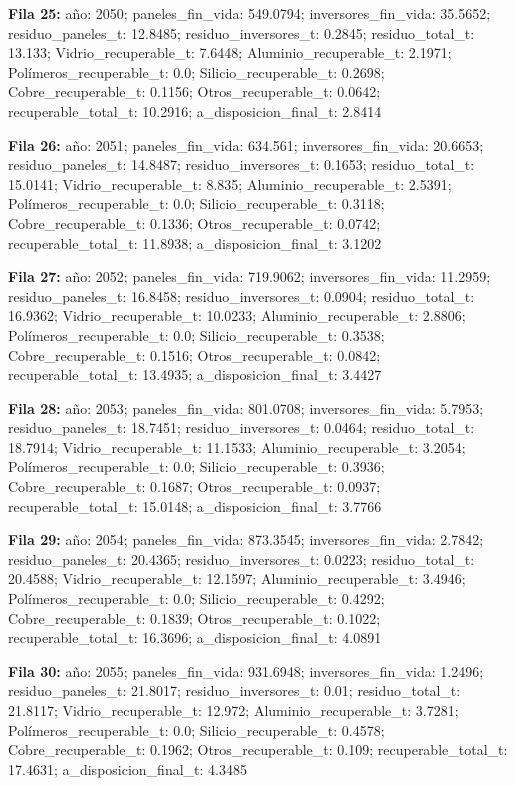 {\footnotesize\textbf{Fila 25:} año: 2050; paneles\_fin\_vida: 549.0794; inversores\_fin\_vida: 35.5652; residuo\_paneles\_t: 12.8485; residuo\_inversores\_t: 0.2845; residuo\_total\_t: 13.133; Vidrio\_recuperable\_t: 7.6448; Aluminio\_recuperable\_t: 2.1971; Polímeros\_recuperable\_t: 0.0; Silicio\_recuperable\_t: 0.2698; Cobre\_recuperable\_t: 0.1156; Otros\_recuperable\_t: 0.0642; recuperable\_total\_t: 10.2916; a\_disposicion\_final\_t: 2.8414\par}
{\footnotesize\textbf{Fila 26:} año: 2051; paneles\_fin\_vida: 634.561; inversores\_fin\_vida: 20.6653; residuo\_paneles\_t: 14.8487; residuo\_inversores\_t: 0.1653; residuo\_total\_t: 15.0141; Vidrio\_recuperable\_t: 8.835; Aluminio\_recuperable\_t: 2.5391; Polímeros\_recuperable\_t: 0.0; Silicio\_recuperable\_t: 0.3118; Cobre\_recuperable\_t: 0.1336; Otros\_recuperable\_t: 0.0742; recuperable\_total\_t: 11.8938; a\_disposicion\_final\_t: 3.1202\par}
{\footnotesize\textbf{Fila 27:} año: 2052; paneles\_fin\_vida: 719.9062; inversores\_fin\_vida: 11.2959; residuo\_paneles\_t: 16.8458; residuo\_inversores\_t: 0.0904; residuo\_total\_t: 16.9362; Vidrio\_recuperable\_t: 10.0233; Aluminio\_recuperable\_t: 2.8806; Polímeros\_recuperable\_t: 0.0; Silicio\_recuperable\_t: 0.3538; Cobre\_recuperable\_t: 0.1516; Otros\_recuperable\_t: 0.0842; recuperable\_total\_t: 13.4935; a\_disposicion\_final\_t: 3.4427\par}
{\footnotesize\textbf{Fila 28:} año: 2053; paneles\_fin\_vida: 801.0708; inversores\_fin\_vida: 5.7953; residuo\_paneles\_t: 18.7451; residuo\_inversores\_t: 0.0464; residuo\_total\_t: 18.7914; Vidrio\_recuperable\_t: 11.1533; Aluminio\_recuperable\_t: 3.2054; Polímeros\_recuperable\_t: 0.0; Silicio\_recuperable\_t: 0.3936; Cobre\_recuperable\_t: 0.1687; Otros\_recuperable\_t: 0.0937; recuperable\_total\_t: 15.0148; a\_disposicion\_final\_t: 3.7766\par}
{\footnotesize\textbf{Fila 29:} año: 2054; paneles\_fin\_vida: 873.3545; inversores\_fin\_vida: 2.7842; residuo\_paneles\_t: 20.4365; residuo\_inversores\_t: 0.0223; residuo\_total\_t: 20.4588; Vidrio\_recuperable\_t: 12.1597; Aluminio\_recuperable\_t: 3.4946; Polímeros\_recuperable\_t: 0.0; Silicio\_recuperable\_t: 0.4292; Cobre\_recuperable\_t: 0.1839; Otros\_recuperable\_t: 0.1022; recuperable\_total\_t: 16.3696; a\_disposicion\_final\_t: 4.0891\par}
{\footnotesize\textbf{Fila 30:} año: 2055; paneles\_fin\_vida: 931.6948; inversores\_fin\_vida: 1.2496; residuo\_paneles\_t: 21.8017; residuo\_inversores\_t: 0.01; residuo\_total\_t: 21.8117; Vidrio\_recuperable\_t: 12.972; Aluminio\_recuperable\_t: 3.7281; Polímeros\_recuperable\_t: 0.0; Silicio\_recuperable\_t: 0.4578; Cobre\_recuperable\_t: 0.1962; Otros\_recuperable\_t: 0.109; recuperable\_total\_t: 17.4631; a\_disposicion\_final\_t: 4.3485\par}
